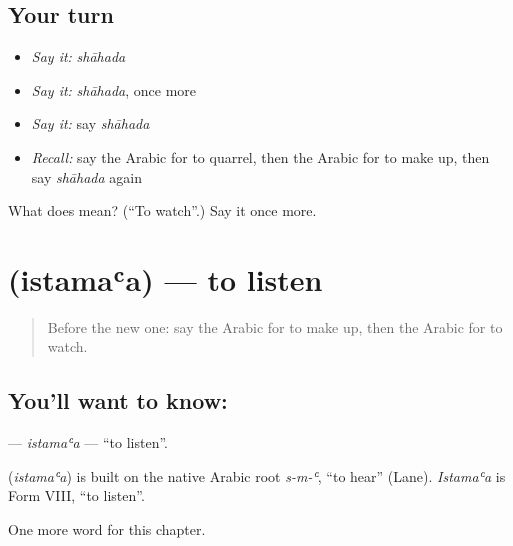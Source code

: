 \subsection*{Your turn}
\begin{itemize}
\raggedright
  \item \emph{Say it:} \emph{shāhada}
  \item \emph{Say it:} \emph{shāhada}, once more
  \item \emph{Say it:} say \emph{shāhada}
  \item \emph{Recall:} say the Arabic for to quarrel, then the Arabic for to make up, then say \emph{shāhada} again
\end{itemize}

\begin{tcolorbox}[breakable,colback=teal!4,colframe=teal!35!black,title={Before you move on}]
What does  mean? (\textquotedblleft{}To watch\textquotedblright{}.) Say it once more.
\end{tcolorbox}
\section[\texorpdfstring{\ar{استمع} (istamaʿa)}{استمع (istamaʿa)}]{ (istamaʿa) — to listen}

\label{lesson:AR-C228-istamaa}



\begin{quote}
Before the new one: say the Arabic for to make up, then the Arabic for to watch.
\end{quote}

\subsection*{You'll want to know: }
\textbf{} — \emph{istamaʿa} — \textquotedblleft{}to listen\textquotedblright{}.

\begin{cousinweb}
\textbf{} (\emph{istamaʿa}) is built on the native Arabic root \emph{s-m-ʿ}, \textquotedblleft{}to hear\textquotedblright{} (Lane). \emph{Istamaʿa} is Form VIII, \textquotedblleft{}to listen\textquotedblright{}.
\end{cousinweb}

\begin{grammarlens}[title={What you've built}]
One more word for this chapter.
\end{grammarlens}

